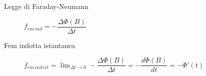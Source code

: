 \documentclass[a4paper,11pt,italian]{article}
\begin{document}
\begin{description}
  \item[Legge di Faraday-Neumann] 
  $ f_{em \, ind} =  - \dfrac{\Delta \Phi(B)}{\Delta t} $
  
  \item[Fem indotta istantanea] 
  $ f_{em \, ind \, ist} =  \displaystyle\lim_{\Delta t \rightarrow 0}- \dfrac{\Delta \Phi(B)}{\Delta t} = - \dfrac{d\Phi(B)}{dt} = - \Phi'(t) $
  
  
  

\end{description}
\end{document}
